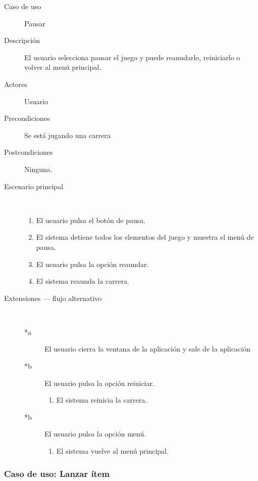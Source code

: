 \begin{description}
    \item[Caso de uso] Pausar
    \item[Descripción] El usuario selecciona pausar el juego y puede reanudarlo, reiniciarlo o volver al menú principal.
    \item[Actores] Usuario
    \item[Precondiciones] Se está jugando una carrera
    \item[Postcondiciones] Ninguna.
    \item[Escenario principal] $\quad$
        \begin{enumerate}
            \item El usuario pulsa el botón de pausa.
            \item El sistema detiene todos los elementos del juego y muestra el menú de pausa.
            \item El usuario pulsa la opción reaundar.
            \item El sistema reaunda la carrera.
        \end{enumerate}
    \item[Extensiones --- flujo alternativo] $\quad$
        \begin{description}
            \item[*a ] El usuario cierra la ventana de la aplicación y sale de la aplicación

            \item[*b] El usuario pulsa la opción reiniciar.
                \begin{enumerate}
                    \item El sistema reinicia la carrera.
                \end{enumerate}
                
            \item[*b] El usuario pulsa la opción menú.
                \begin{enumerate}
                    \item El sistema vuelve al menú principal.
                \end{enumerate}
        \end{description}
\end{description}

\subsubsection{Caso de uso: Lanzar ítem}

